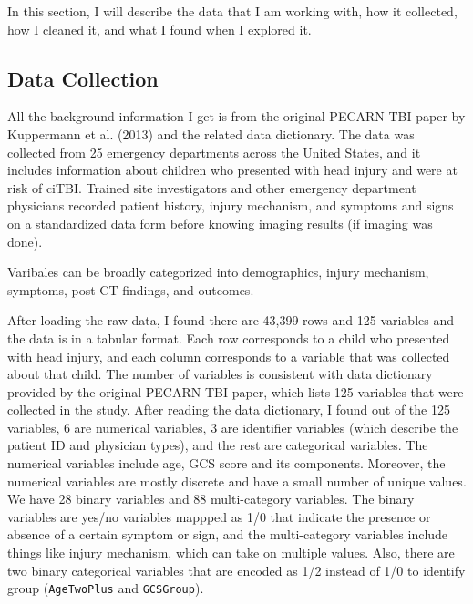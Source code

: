 \documentclass[10pt,letterpaper]{article}
\begin{document}
In this section, I will describe the data that I am working with, how it collected, how I cleaned it, and what I found when I explored it.

\subsection{Data Collection}\label{data-collection}

All the background information I get is from the original PECARN TBI paper by Kuppermann et al. (2013) and the related data dictionary. The data was collected from 25 emergency departments across the United States, and it includes information about children who presented with head injury and were at risk of ciTBI.
Trained site investigators and other emergency department physicians recorded patient history, injury mechanism, and symptoms and signs on a standardized data form before knowing imaging results (if imaging was done).

Varibales can be broadly categorized into demographics, injury mechanism, symptoms, post-CT findings, and outcomes. 

After loading the raw data, I found there are 43,399 rows and 125 variables and the data is in a tabular format. Each row corresponds to a child who presented with head injury, and each column corresponds to a variable that was collected about that child.
The number of variables is consistent with data dictionary provided by the original PECARN TBI paper, which lists 125 variables that were collected in the study.
After reading the data dictionary, I found out of the 125 variables, 6 are numerical variables, 3 are identifier variables (which describe the patient ID and physician types), and the rest are categorical variables. The numerical variables include age, GCS score and its components. Moreover, the numerical variables are mostly discrete and have a small number of unique values. We have 28 binary variables and 88 multi-category variables. The binary variables are yes/no variables mappped as 1/0 that indicate the presence or absence of a certain symptom or sign, and the multi-category variables include things like injury mechanism, which can take on multiple values. Also, there are two binary categorical variables that are encoded as 1/2 instead of 1/0 to identify group (\texttt{AgeTwoPlus} and \texttt{GCSGroup}).
\end{document}
